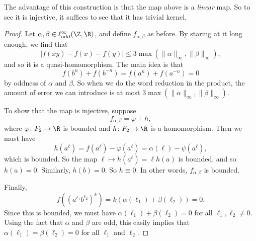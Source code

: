 \documentclass[a4paper]{article}
\newcommand\Free{F}
\begin{document}
The advantage of this construction is that the map above is a \emph{linear} map. So to see it is injective, it suffices to see that it has trivial kernel.
\begin{proof}
  Let $\alpha, \beta \in \ell_{\mathrm{odd}}^\infty (\Z, \R)$, and define $f_{\alpha, \beta}$ as before. By staring at it long enough, we find that
  \[
    |f(xy) - f(x) - f(y)| \leq 3 \max (\|\alpha\|_\infty, \|\beta\|_\infty),
  \]
  and so it is a quasi-homomorphism. The main idea is that
  \[
    f(b^n) + f(b^{-n}) = f(a^n) + f(a^{-n}) = 0
  \]
  by oddness of $\alpha$ and $\beta$. So when we do the word reduction in the product, the amount of error we can introduce is at most $3 \max (\|\alpha\|_\infty, \|\beta\|_\infty)$.

  To show that the map is injective, suppose
  \[
    f_{\alpha, \beta} = \varphi + h,
  \]
  where $\varphi\colon \Free_2 \to \R$ is bounded and $h\colon \Free_2 \to \R$ is a homomorphism. Then we must have
  \[
    h(a^\ell) = f(a^\ell) - \varphi(a^\ell) = \alpha(\ell) - \psi(a^\ell),
  \]
  which is bounded. So the map $\ell \mapsto h(a^\ell) = \ell h(a)$ is bounded, and so $h(a) = 0$. Similarly, $h(b) = 0$. So $h \equiv 0$. In other words, $f_{\alpha, \beta}$ is bounded.

  Finally,
  \[
    f((a^{\ell_1} b^{\ell_2})^k) = k (\alpha(\ell_1) + \beta(\ell_2)) = 0.
  \]
  Since this is bounded, we must have $\alpha(\ell_1) + \beta(\ell_2) = 0$ for all $\ell_1, \ell_2 \not= 0$. Using the fact that $\alpha$ and $\beta$ are odd, this easily implies that $\alpha(\ell_1) = \beta(\ell_2) = 0$ for all $\ell_1$ and $\ell_2$.

%
\end{proof}
\end{document}
